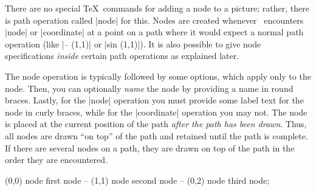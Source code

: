 There are no special \TeX\ commands for adding a node to a picture; rather,
there is path operation called |node| for this. Nodes are created
whenever \tikzname\ encounters |node| or |coordinate| at a point on a
path where it would expect a normal path operation (like |-- (1,1)| or
|sin (1,1)|). It is also possible to give node specifications
\emph{inside} certain path operations as explained later.

The node operation is typically followed by some options, which apply
only to the node. Then, you can optionally \emph{name} the node by
providing a name in round braces. Lastly, for the |node| operation you
must provide some label text for the node in curly braces, while for
the |coordinate| operation you may not. The node is placed at the
current position of the path \emph{after the path has been
  drawn}. Thus, all nodes are drawn ``on top'' of the path and
retained until the path is complete. If there are several nodes on a
path, they are drawn on top of the path in the order they are
encountered.

\begin{codeexample}[]
\tikz \fill[fill=examplefill]
     (0,0) node {first node}
  -- (1,1) node {second node}
  -- (0,2) node {third node};
\end{codeexample}

